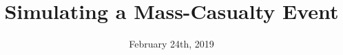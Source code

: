 \documentclass{beamer}
\begin{document}
\newcommand{\clg}{\mathcal{G}}
\newcommand{\clb}{\mathcal{B}}
\newcommand{\cls}{\mathcal{S}}
\newcommand{\clc}{\mathcal{C}}
\newcommand{\clj}{\mathcal{J}}
\newcommand{\clm}{\mathcal{M}}
\newcommand{\clx}{\mathcal{X}}
\newcommand{\cld}{\mathcal{D}}
\newcommand{\cle}{\mathcal{E}}
\newcommand{\clv}{\mathcal{V}}
\newcommand{\clu}{\mathcal{U}}
\newcommand{\clr}{\mathcal{R}}
\newcommand{\clt}{\mathcal{T}}
\newcommand{\cll}{\mathcal{L}}
\newcommand{\clz}{\mathcal{Z}}
\newcommand{\clq}{\mathcal{Q}}

\newcommand{\cli}{\mathcal{I}}
\newcommand{\clp}{\mathcal{P}}
\newcommand{\cla}{\mathcal{A}}
\newcommand{\clf}{\mathcal{F}}
\newcommand{\clh}{\mathcal{H}}
\newcommand{\clo}{\mathcal{O}}
\newcommand{\N}{\mathbb{N}}
\newcommand{\Q}{\mathbb{Q}}
\newcommand{\bfx}{{\boldsymbol{x}}}
\newcommand{\bfa}{{\boldsymbol{a}}}
\newcommand{\bfh}{{\boldsymbol{h}}}
\newcommand{\bfs}{{\boldsymbol{s}}}
\newcommand{\bfm}{{\boldsymbol{m}}}
\newcommand{\bff}{{\boldsymbol{f}}}
\newcommand{\bfb}{{\boldsymbol{b}}}
\newcommand{\bfw}{{\boldsymbol{w}}}
\newcommand{\bfz}{{\boldsymbol{z}}}
\newcommand{\bfu}{{\boldsymbol{u}}}
\newcommand{\bfell}{{\boldsymbol{\ell}}}
\newcommand{\bfn}{{\boldsymbol{n}}}
\newcommand{\bfd}{{\boldsymbol{d}}}
\newcommand{\bfbeta}{{\boldsymbol{\beta}}}
\newcommand{\bfzeta}{{\boldsymbol{\zeta}}}
\newcommand{\bfnu}{{\boldsymbol{\nu}}}
\newcommand{\bfvarphi}{{\boldsymbol{\varphi}}}

\newcommand{\curvz}{{\bf \mathpzc{z}}}
\newcommand{\curvx}{{\bf \mathpzc{x}}}
\newcommand{\curvi}{{\bf \mathpzc{i}}}
\newcommand{\curvs}{{\bf \mathpzc{s}}}
\newcommand{\blip}{\mathbb{B}_1}

\newcommand{\BM}{\mbox{BM}}

\newcommand{\tac}{\mbox{\scriptsize{AC}}}

\title[Triage]{Simulating a Mass-Casualty Event} %

\date{February 24th, 2019} %
\end{document}
